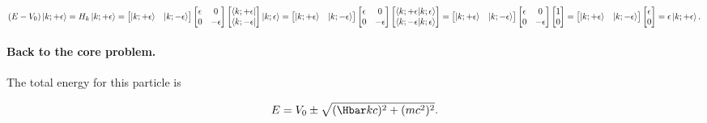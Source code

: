 \begin{dmath}\label{eqn:gradQuantumProblemSet4Problem3:540}
(E - V_0) \ket{k; +\epsilon}
=
H_k \ket{k; +\epsilon}
=
\begin{bmatrix}
\ket{k;+\epsilon} &
\ket{k;-\epsilon}
\end{bmatrix}
\begin{bmatrix}
\epsilon & 0 \\
0 & -\epsilon
\end{bmatrix}
\begin{bmatrix}
\bra{k;+\epsilon} \\
\bra{k;-\epsilon}
\end{bmatrix}
\ket{k; \epsilon}
=
\begin{bmatrix}
\ket{k;+\epsilon} &
\ket{k;-\epsilon}
\end{bmatrix}
\begin{bmatrix}
\epsilon & 0 \\
0 & -\epsilon
\end{bmatrix}
\begin{bmatrix}
\braket{k;+\epsilon}{k; \epsilon} \\
\braket{k;-\epsilon}{k; \epsilon}
\end{bmatrix}
=
\begin{bmatrix}
\ket{k;+\epsilon} &
\ket{k;-\epsilon}
\end{bmatrix}
\begin{bmatrix}
\epsilon & 0 \\
0 & -\epsilon
\end{bmatrix}
\begin{bmatrix}
1 \\
0
\end{bmatrix}
=
\begin{bmatrix}
\ket{k;+\epsilon} &
\ket{k;-\epsilon}
\end{bmatrix}
\begin{bmatrix}
\epsilon \\
0 
\end{bmatrix}
=
\epsilon
\ket{k;+\epsilon}.
\end{dmath}

\paragraph{Back to the core problem.}

The total energy for this particle is

\begin{dmath}\label{eqn:gradQuantumProblemSet4Problem3:560}
E = V_0 \pm \sqrt{(\Hbar k c)^2 + (m c^2)^2}.
\end{dmath}


